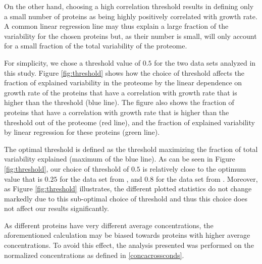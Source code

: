 \documentclass[a4paper]{article}
\begin{document}
On the other hand, choosing a high correlation threshold results in defining only a small number of proteins as being highly positively correlated with growth rate.
A common linear regression line may thus explain a large fraction of the variability for the chosen proteins but, as their number is small, will only account for a small fraction of the total variability of the proteome.

For simplicity, we chose a threshold value of $0.5$ for the two data sets analyzed in this study.
Figure \ref{fig:threshold} shows how the choice of threshold affects the fraction of explained variability in the proteome by the linear dependence on growth rate of the proteins that have a correlation with growth rate that is higher than the threshold (blue line).
The figure also shows the fraction of proteins that have a correlation with growth rate that is higher than the threshold out of the proteome (red line), and the fraction of explained variability by linear regression for these proteins (green line).

The optimal threshold is defined as the threshold maximizing the fraction of total variability explained (maximum of the blue line).
As can be seen in Figure \ref{fig:threshold}, our choice of threshold of $0.5$ is relatively close to the optimum value that is $0.25$ for the data set from \cite{Heinemann2015}, and $0.8$ for the data set from \cite{Valgepea2013}.
Moreover, as Figure \ref{fig:threshold} illustrates, the different plotted statistics do not change markedly due to this sub-optimal choice of threshold and thus this choice does not affect our results significantly.

As different proteins have very different average concentrations, the aforementioned calculation may be biased towards proteins with higher average concentrations.
To avoid this effect, the analysis presented was performed on the normalized concentrations as defined in \ref{concacrossconds}.
\end{document}
